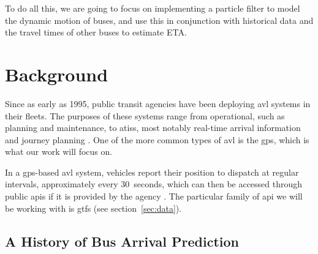 \documentclass[12pt,a4paper]{article}
\begin{document}
To do all this, we are going to focus on implementing a particle filter to model the dynamic motion of buses,
and use this in conjunction with historical data and the travel times of other buses to estimate ETA.



\section{Background}
\label{sec:background}












Since as early as 1995, public transit agencies have been deploying \gls{avl} systems
in their fleets.
The purposes of these systems range from operational, such as planning and maintenance, 
to \glspl{atis}, most notably real-time arrival information and journey planning
\citep{tcrp:2003}.
One of the more common types of \gls{avl} is the \gls{gps},
which is what our work will focus on.


In a \gls{gps}-based \gls{avl} system, vehicles report their position to dispatch
at regular intervals, approximately every 30~seconds,
which can then be accessed through public \glspl{api} if it is provided by the agency
\citep{tcrp:2003}.
The particular family of \gls{api} we will be working with is \gls{gtfs}
(see section~\ref{sec:data}).



\subsection{A History of Bus Arrival Prediction}
\label{sec:history}
\end{document}
